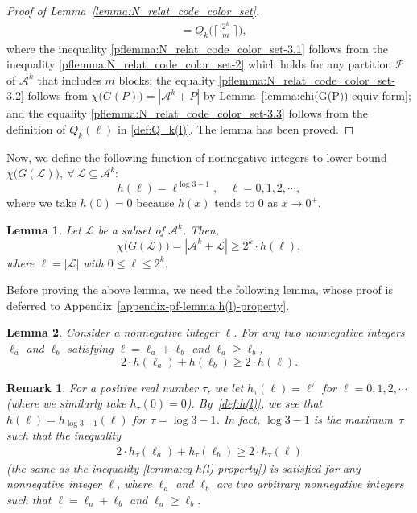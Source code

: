 \documentclass[11pt,draftclsnofoot,onecolumn]{IEEEtran}
\newtheorem{lemma}{Lemma}
\newtheorem{remark}{Remark}
\begin{document}
\begin{proof}[Proof of Lemma~\ref{lemma:N_relat_code_color_set}]
\begin{align}
&=Q_{k}\Big(\Big\lceil\;\frac{2^{k}}{m}\;\Big\rceil\Big),\label{pflemma:N_relat_code_color_set-3.3}
\end{align}
where the inequality \eqref{pflemma:N_relat_code_color_set-3.1} follows from the inequality \eqref{pflemma:N_relat_code_color_set-2} which  holds for any partition $\mathcal{P}$ of $\mathcal{A}^k$ that includes $m$ blocks;   the  equality \eqref{pflemma:N_relat_code_color_set-3.2} follows from $\chi\big(G(P)\big)=|\mathcal{A}^k+P|$ by Lemma~\ref{lemma:chi(G(P))-equiv-form}; and  the  equality \eqref{pflemma:N_relat_code_color_set-3.3} follows from the definition of $Q_k(\ell)$ in \eqref{def:Q_k(l)}.
The lemma has been proved.
\end{proof}


Now, we define the following function of nonnegative integers to lower bound $\chi\big(G(\mathcal{L})\big),~\forall~\mathcal{L}\subseteq\mathcal{A}^k$:
\begin{equation}
h(\ell)=\ell^{\log 3-1},\quad \ell=0,1,2,\cdots,\label{def:h(l)}
\end{equation}
where we take $h(0)=0$ because $h(x)$ tends to $0$ as $x\to 0^{+}$.

\begin{lemma}\label{lemma:N_X+L_low_bound}
Let $\mathcal{L}$ be a subset of $\mathcal{A}^k$. Then,
\begin{equation*}
 \chi\big(G(\mathcal{L})\big)=|\mathcal{A}^{k}+\mathcal{L}|\geq 2^{k}\cdot h(\ell),\label{lemma:eq-N_X+L_low_bound}
  \end{equation*}
  where $\ell=|\mathcal{L}|$ with $0\leq \ell\leq 2^k$.
\end{lemma}

 Before proving the above lemma, we need the following lemma, whose proof is deferred to Appendix~\ref{appendix-pf-lemma:h(l)-property}.

\begin{lemma}\label{lemma:h(l)-property}
Consider a nonnegative integer $\ell$.
For any two nonnegative integers $\ell_a$ and $\ell_b$ satisfying $\ell=\ell_a+\ell_b$ and $\ell_a\geq\ell_b$,
\begin{equation}
2\cdot h(\ell_a)+h(\ell_b)\geq 2\cdot h(\ell).\label{lemma:eq-h(l)-property}
\end{equation}
\end{lemma}

\begin{remark}
For a positive real number $\tau$, we let $h_{\tau}(\ell)=\ell^{\tau}$ for $\ell=0,1,2,\cdots$ {\rm{(}}where we similarly take $h_{\tau}(0)=0${\rm{)}}. By~\eqref{def:h(l)}, we see that $h(\ell)=h_{\log3-1}(\ell)$ for $\tau=\log3-1$.
In fact, $\log3-1$ is the maximum~$\tau$ such that the inequality
\begin{align*}
2\cdot h_{\tau}(\ell_{a})+h_{\tau}(\ell_{b})\geq 2\cdot h_{\tau}(\ell)
\end{align*}
(the same as the inequality \eqref{lemma:eq-h(l)-property}) is satisfied for any nonnegative integer $\ell$, where $\ell_a$ and $\ell_b$ are two arbitrary nonnegative integers  such that $\ell=\ell_a+\ell_b$ and $\ell_a\geq\ell_b$.
\end{remark}
\end{document}

